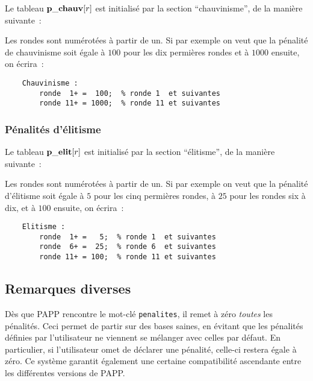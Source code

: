 \documentclass[10pt]{article}
\begin{document}
Le tableau ${\bf p\_chauv}[r]$ est initialis\'e par la section
``chauvinisme'', de la mani\`ere suivante~:

\medbreak
{}
\medbreak

Les rondes sont num\'erot\'ees \`a partir de un. Si par exemple on veut
que la p\'enalit\'e de chauvinisme soit \'egale \`a $100$ pour les dix
permi\`eres rondes et \`a $1000$ ensuite, on \'ecrira~:
\begin{verbatim}
    Chauvinisme :
        ronde  1+ =  100;  % ronde 1  et suivantes
        ronde 11+ = 1000;  % ronde 11 et suivantes
\end{verbatim}

\subsubsection{P\'enalit\'es d'\'elitisme}

Le tableau ${\bf p\_elit}[r]$ est initialis\'e par la section
``\'elitisme'', de la mani\`ere suivante~:

\medbreak
{}
\medbreak


Les rondes sont num\'erot\'ees \`a partir de un.  Si par exemple on 
veut que la p\'enalit\'e d'\'elitisme soit \'egale \`a $5$ pour les 
cinq permi\`eres rondes, \`a $25$ pour les rondes six \`a dix, et \`a 
$100$ ensuite, on \'ecrira~:
\begin{verbatim}
    Elitisme :
        ronde  1+ =   5;  % ronde 1  et suivantes
        ronde  6+ =  25;  % ronde 6  et suivantes
        ronde 11+ = 100;  % ronde 11 et suivantes
\end{verbatim}

\subsection{Remarques diverses}

	D\`es que PAPP rencontre le mot-cl\'e \verb|penalites|, il remet
\`a z\'ero {\em toutes\/} les p\'enalit\'es. Ceci permet de partir sur
des bases saines, en \'evitant que les p\'enalit\'es d\'efinies par
l'utilisateur ne viennent se m\'elanger avec celles par d\'efaut. En
particulier, si l'utilisateur omet de d\'eclarer une p\'enalit\'e,
celle-ci restera \'egale \`a z\'ero. Ce syst\`eme garantit \'egalement une
certaine compatibilit\'e ascendante entre les diff\'erentes versions de
PAPP.
\end{document}
